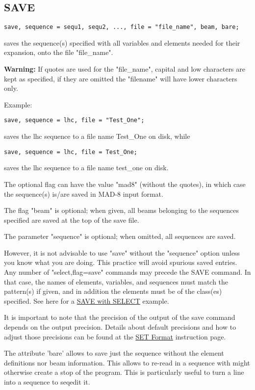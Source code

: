 \subsection{SAVE}
\label{subsec:general_save}
\begin{verbatim}
save, sequence = sequ1, sequ2, ..., file = "file_name", beam, bare;
\end{verbatim} 
saves the sequence(s) specified with all variables and elements needed
for their expansion, onto the file "file\_name". 

{\bf Warning:} If quotes are used for
the "file\_name", capital and low characters are kept as specified, if they
are omitted the "filename" will have lower characters only. 

Example:
\begin{verbatim}
save, sequence = lhc, file = "Test_One";
\end{verbatim}
saves the lhc sequence to a file name Test\_One on disk, while
\begin{verbatim}
save, sequence = lhc, file = Test_One;
\end{verbatim}
saves the lhc sequence to a file name test\_one on disk.

The optional
flag can have the value "mad8" (without the quotes), in which case the
sequence(s) is/are saved in MAD-8 input format.  

The flag "beam" is optional; when given, all beams belonging to the
sequences specified are saved at the top of the save file.  

The parameter "sequence" is optional; when omitted, all sequences are
saved.  

However, it is not advisable to use "save" without the "sequence" option
unless you know what you are doing. This practice will avoid spurious
saved entries.    Any number of "select,flag=save" commands may precede
the SAVE command. In that case, the names of elements, variables, and
sequences must match the pattern(s) if given, and in addition the
elements must be of the class(es) specified. See here for a
\href{../Introduction/select.html#save_select}{SAVE with SELECT}
example.  

It is important to note that the precision of the output of the save
command depends on the output precision. Details about default
precisions and how to adjust those precisions can be found at the
\href{../Introduction/set.html#Format}{SET Format} instruction page.   
 
The attribute 'bare' allows to save just the sequence without the
element definitions nor beam information. This allows to re-read in a
sequence with might otherwise create a stop of the program. This is
particularly useful to turn a line into a sequence to seqedit
it. 

